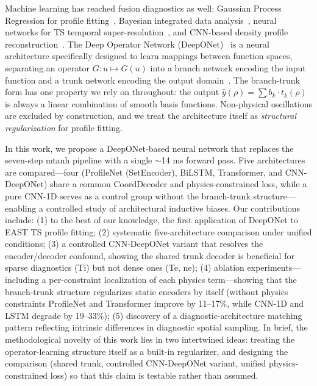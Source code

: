 \documentclass[a4paper,12pt]{article}
\begin{document}
Machine learning has reached fusion diagnostics as well: Gaussian Process Regression for profile fitting~\cite{gpr_profiles,gpr_review}, Bayesian integrated data analysis~\cite{ida_east}, neural networks for TS temporal super-resolution~\cite{diag2diag}, and CNN-based density profile reconstruction~\cite{lan_cnn_east}. The Deep Operator Network (DeepONet)~\cite{deeponet} is a neural architecture specifically designed to learn mappings between function spaces, separating an operator $G: u \mapsto G(u)$ into a branch network encoding the input function and a trunk network encoding the output domain~\cite{physics_informed_deeponet,pinn_review}. The branch-trunk form has one property we rely on throughout: the output $\hat{y}(\rho) = \sum b_k \cdot t_k(\rho)$ is always a linear combination of smooth basis functions. Non-physical oscillations are excluded by construction, and we treat the architecture itself as \textit{structural regularization} for profile fitting.

In this work, we propose a DeepONet-based neural network that replaces the seven-step mtanh pipeline with a single $\sim$14 ms forward pass. Five architectures are compared---four (ProfileNet (SetEncoder), BiLSTM, Transformer, and CNN-DeepONet) share a common CoordDecoder and physics-constrained loss, while a pure CNN-1D serves as a control group without the branch-trunk structure---enabling a controlled study of architectural inductive biases. Our contributions include: (1) to the best of our knowledge, the first application of DeepONet to EAST TS profile fitting; (2) systematic five-architecture comparison under unified conditions; (3) a controlled CNN-DeepONet variant that resolves the encoder/decoder confound, showing the shared trunk decoder is beneficial for sparse diagnostics (Ti) but not dense ones (Te, ne); (4) ablation experiments---including a per-constraint localization of each physics term---showing that the branch-trunk structure regularizes static encoders by itself (without physics constraints ProfileNet and Transformer improve by 11--17\%, while CNN-1D and LSTM degrade by 19--33\%); (5) discovery of a diagnostic-architecture matching pattern reflecting intrinsic differences in diagnostic spatial sampling. In brief, the methodological novelty of this work lies in two intertwined ideas: treating the operator-learning structure itself as a built-in regularizer, and designing the comparison (shared trunk, controlled CNN-DeepONet variant, unified physics-constrained loss) so that this claim is testable rather than assumed.
\end{document}
